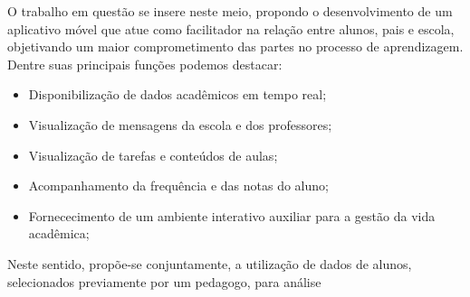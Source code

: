 O trabalho em questão se insere neste meio, propondo o desenvolvimento de um aplicativo móvel que atue como facilitador na relação entre alunos, pais e escola, objetivando um maior comprometimento das partes no processo de aprendizagem. Dentre suas principais funções podemos destacar:
\begin{itemize}
	\item Disponibilização de dados acadêmicos em tempo real;
	\item Visualização de mensagens da escola e dos professores;
	\item Visualização de tarefas e conteúdos de aulas;
	\item Acompanhamento da frequência e das notas do aluno;
	\item Fornececimento de um ambiente interativo auxiliar para a gestão da vida acadêmica;
\end{itemize}

Neste sentido, propõe-se conjuntamente, a utilização de dados de alunos, selecionados previamente por um pedagogo, para análise 